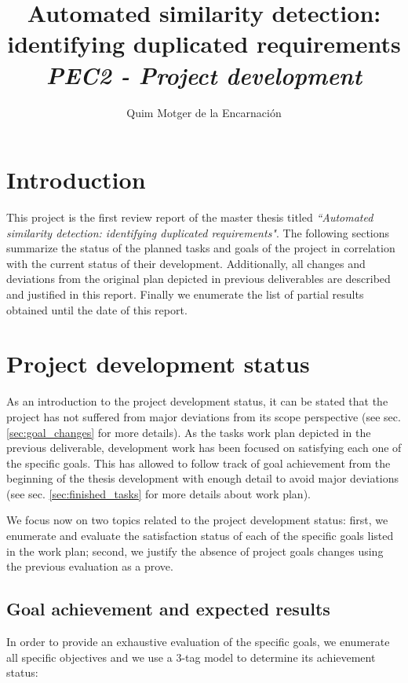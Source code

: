\documentclass[11pt]{article}
\title{Automated similarity detection:\\ identifying duplicated requirements\\\textit{PEC2 - Project development}}
\author{
%
Quim Motger de la Encarnación
\institution{Universitat Oberta de Catalunya\\Universitat Politecnica de Catalunya}
}
\begin{document}
\maketitle

\section{Introduction}
\label{sec:introduction}

This project is the first review report of the master thesis titled \textit{``Automated similarity detection: identifying duplicated requirements"}. The following sections summarize the status of the planned tasks and goals of the project in correlation with the current status of their development. Additionally, all changes and deviations from the original plan depicted in previous deliverables are described and justified in this report. Finally we enumerate the list of partial results obtained until the date of this report.

\section{Project development status}
\label{sec:project_status}

As an introduction to the project development status, it can be stated that the project has not suffered from major deviations from its scope perspective (see sec. \ref{sec:goal_changes} for more details). As the tasks work plan depicted in the previous deliverable, development work has been focused on satisfying each one of the specific goals. This has allowed to follow track of goal achievement from the beginning of the thesis development with enough detail to avoid major deviations (see sec. \ref{sec:finished_tasks} for more details about work plan).

We focus now on two topics related to the project development status: first, we enumerate and evaluate the satisfaction status of each of the specific goals listed in the work plan; second, we justify the absence of project goals changes using the previous evaluation as a prove.

\subsection{Goal achievement and expected results}
\label{sec:goal_and_results}

In order to provide an exhaustive evaluation of the specific goals, we enumerate all specific objectives and we use a 3-tag model to determine its achievement status:
\end{document}
